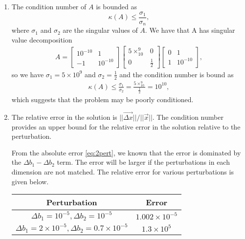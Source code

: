 \documentclass[10pt]{article}
\begin{document}
\begin{enumerate}
\begin{enumerate}
      \item The condition number of \(A\) is bounded as \[\kappa(A) \leq \frac{\sigma_1}{\sigma_n},\] where \(\sigma_1\) and \(\sigma_2\) are the singular values of \(A\). We have that A has singular value decomposition \begin{align*}
          A = \begin{bmatrix}
            10^{-10} & 1 \\
            -1       & 10^{-10}
          \end{bmatrix} \begin{bmatrix}
            5\times_10^9 & 0 \\ 0 & \frac{1}{2}
          \end{bmatrix} \begin{bmatrix}
            0 & 1 \\ 1 & 10^{-10}
          \end{bmatrix},
      \end{align*} so we have \(\sigma_1 = 5\times 10^9\) and \(\sigma_2 = \frac{1}{2}\) and the condition number is bound as \begin{align*}
          \kappa (A) \leq \frac{\sigma_1}{\sigma_2} = \frac{5\times_10^9}{\frac{1}{2}} = 10^10,
      \end{align*} which suggests that the problem may be poorly conditioned.

      \item The relative error in the solution is \(||\vec{\Delta x}|| / ||\vec{x}||\). The condition number provides an upper bound for the relative error in the solution relative to the perturbation.
      
      From the absolute error \eqref{eq:2pert}, we known that the error is dominated by the \(\Delta b_1 - \Delta b_2\) term. The error will be larger if the perturbations in each dimension are not matched. The relative error for various perturbations is given below.

      \begin{center}
        \begin{tabular}{c|c}
          Perturbation & Error \\
          \hline
          \(\Delta b_1 = 10^{-5}, \Delta b_2 = 10^{-5}\) & \(1.002\times 10^{-5}\) 
          \\ \hline
          \(\Delta b_1 = 2\times10^{-5}, \Delta b_2 = 0.7\times10^{-5}\) & \(1.3 \times 10^5\)
        \end{tabular}
      \end{center}


\end{enumerate}
\end{enumerate}
\end{document}
